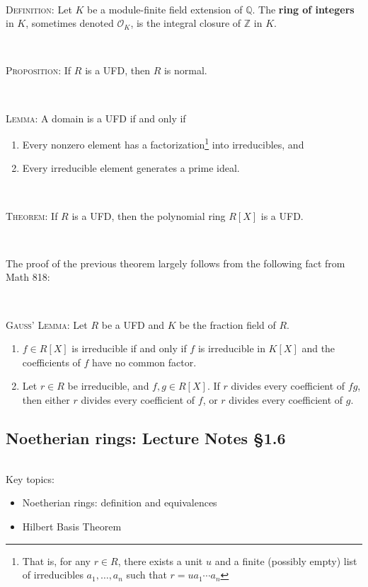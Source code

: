 \documentclass[12pt]{amsart}
\newcommand{\Q}{\mathbb{Q}}
\newcommand{\Z}{\mathbb{Z}}
\newcommand{\0}{$\phantom{.}$}
\newcommand{\1}{\mathbbm{1}}
\begin{document}
\

\noindent \textsc{Definition:} Let $K$ be a module-finite field extension of $\Q$. The \textbf{ring of integers} in $K$, sometimes denoted $\mathcal{O}_K$, is the integral closure of $\Z$ in $K$.


\

\noindent \textsc{Proposition:} If $R$ is a UFD, then $R$ is normal.

\

\noindent \textsc{Lemma:} A domain is a UFD if and only if
\begin{enumerate}
\item Every nonzero element has a factorization\footnote{That is, for any $r\in R$, there exists a unit $u$ and a finite (possibly empty) list of irreducibles $a_1,\dots,a_n$ such that $r=u a_1 \cdots a_n$} into irreducibles, and
\item Every irreducible element generates a prime ideal.
\end{enumerate}

\

\noindent \textsc{Theorem:} If $R$ is a UFD, then the polynomial ring $R[X]$ is a UFD.

\

\noindent The proof of the previous theorem largely follows from the following fact from Math 818:

\

\noindent \textsc{Gauss' Lemma:} Let $R$ be a UFD and $K$ be the fraction field of $R$.
\begin{enumerate}
\item $f\in R[X]$ is irreducible if and only if $f$ is irreducible in $K[X]$ and the coefficients of $f$ have no common factor.
\item Let $r\in R$ be irreducible, and $f,g\in R[X]$. If $r$ divides every coefficient of $fg$, then either $r$ divides every coefficient of $f$, or $r$ divides every coefficient of $g$.
\end{enumerate}

\vfill




\newpage
\subsection{Noetherian rings:  Lecture Notes \S1.6} \0

\begin{framed} Key topics:
\begin{itemize}
\item Noetherian rings: definition and equivalences
\item Hilbert Basis Theorem
\end{itemize}
\end{framed}
\end{document}

